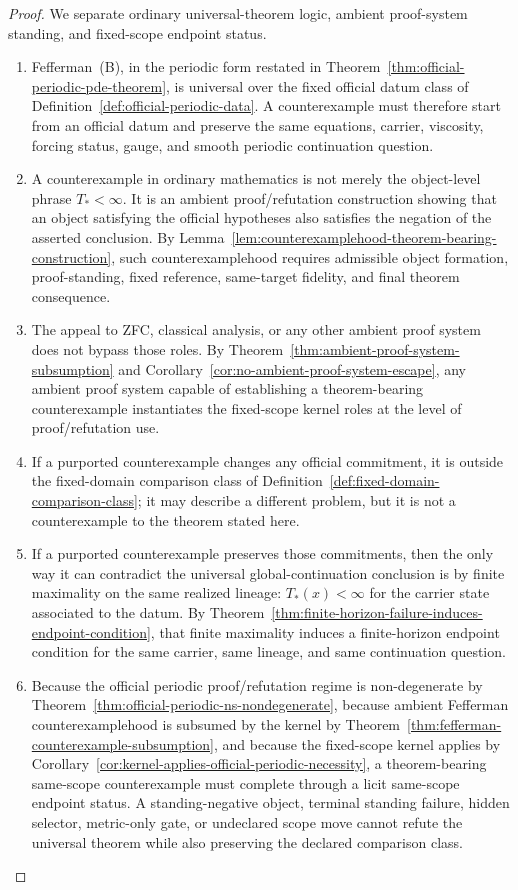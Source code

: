 \begin{proof}
We separate ordinary universal-theorem logic, ambient proof-system standing, and fixed-scope endpoint status.
\begin{enumerate}[leftmargin=2.2em,itemsep=0.2em]
\item Fefferman~(B), in the periodic form restated in Theorem~\ref{thm:official-periodic-pde-theorem}, is universal over the fixed official datum class of Definition~\ref{def:official-periodic-data}. A counterexample must therefore start from an official datum and preserve the same equations, carrier, viscosity, forcing status, gauge, and smooth periodic continuation question.
\item A counterexample in ordinary mathematics is not merely the object-level phrase $T_*<\infty$. It is an ambient proof/refutation construction showing that an object satisfying the official hypotheses also satisfies the negation of the asserted conclusion. By Lemma~\ref{lem:counterexamplehood-theorem-bearing-construction}, such counterexamplehood requires admissible object formation, proof-standing, fixed reference, same-target fidelity, and final theorem consequence.
\item The appeal to ZFC, classical analysis, or any other ambient proof system does not bypass those roles. By Theorem~\ref{thm:ambient-proof-system-subsumption} and Corollary~\ref{cor:no-ambient-proof-system-escape}, any ambient proof system capable of establishing a theorem-bearing counterexample instantiates the fixed-scope kernel roles at the level of proof/refutation use.
\item If a purported counterexample changes any official commitment, it is outside the fixed-domain comparison class of Definition~\ref{def:fixed-domain-comparison-class}; it may describe a different problem, but it is not a counterexample to the theorem stated here.
\item If a purported counterexample preserves those commitments, then the only way it can contradict the universal global-continuation conclusion is by finite maximality on the same realized lineage: $T_*(x)<\infty$ for the carrier state associated to the datum. By Theorem~\ref{thm:finite-horizon-failure-induces-endpoint-condition}, that finite maximality induces a finite-horizon endpoint condition for the same carrier, same lineage, and same continuation question.
\item Because the official periodic proof/refutation regime is non-degenerate by Theorem~\ref{thm:official-periodic-ns-nondegenerate}, because ambient Fefferman counterexamplehood is subsumed by the kernel by Theorem~\ref{thm:fefferman-counterexample-subsumption}, and because the fixed-scope kernel applies by Corollary~\ref{cor:kernel-applies-official-periodic-necessity}, a theorem-bearing same-scope counterexample must complete through a licit same-scope endpoint status. A standing-negative object, terminal standing failure, hidden selector, metric-only gate, or undeclared scope move cannot refute the universal theorem while also preserving the declared comparison class.

\end{enumerate}
\end{proof}

